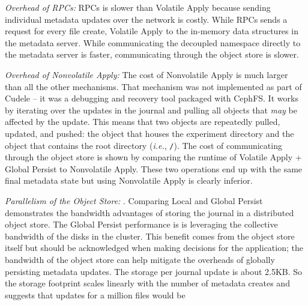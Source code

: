 {\it Overhead of RPCs:} RPCs is
\oldcomment{\(66\times\)}\newcomment{\(19.9\times\)} slower than Volatile Apply
because sending individual metadata updates over the network is costly.  While
RPCs sends a request for every file create, Volatile Apply  to the in-memory data structures in the metadata server. While
communicating the decoupled namespace directly to the metadata server
 is faster, communicating through the object
store  is
\oldcomment{\(10\times\)}\newcomment{\(78\times\)} slower.

{\it Overhead of Nonvolatile Apply:} The cost of Nonvolatile Apply is much
larger than all the other mechanisms.  That mechanism was not implemented as
part of Cudele -- it was a debugging and recovery tool packaged with CephFS. It
works by iterating over the updates in the journal and pulling all objects that
{\it may} be affected by the update.  This means that two objects are
repeatedly pulled, updated, and pushed: the object that houses the experiment
directory and the object that contains the root directory ({\it i.e.},
\texttt{/}).  The cost of communicating through the object store is shown by
comparing the runtime of Volatile Apply + Global Persist
\newcomment{(\(1.3\times\))} to Nonvolatile Apply\newcomment{ (\(78\times\))}.
These two operations end up with the same final metadata state but using
Nonvolatile Apply is clearly inferior.

{\it Parallelism of the Object Store:} .  Comparing Local and Global
Persist demonstrates the bandwidth advantages of storing the journal in a
distributed object store. The Global Persist performance is  is
leveraging the collective bandwidth of the disks in the cluster. This benefit
comes from the object store itself but should be acknowledged when making
decisions for the application; the bandwidth of the object store can help
mitigate the overheads of globally persisting metadata updates. The storage per
journal update is about 2.5KB. So the storage footprint scales linearly with
the number of metadata creates and suggests that updates for a million files
would be 

